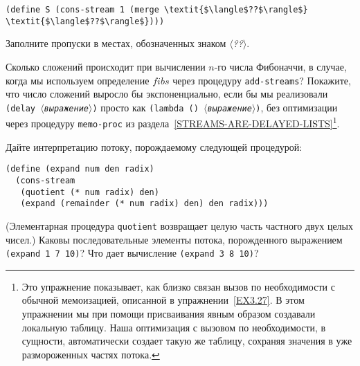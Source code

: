 \begin{exercise}{3.56}
\begin{Verbatim}[fontsize=\small]
(define S (cons-stream 1 (merge \textit{$\langle$??$\rangle$} \textit{$\langle$??$\rangle$})))
\end{Verbatim}
Заполните пропуски в местах, обозначенных знаком \textit{$\langle$??$\rangle$}.
\end{exercise}
\begin{exercise}{3.57}\label{EX3.57}%
Сколько сложений происходит при вычислении
$n$-го числа Фибоначчи, в случае, когда мы используем
определение $fibs$ через процедуру
{\tt add-streams}?  Покажите, что число сложений выросло бы
экспоненциально, если бы мы реализовали
{\tt (delay \textit{$\langle$выраже\-ние$\rangle$})} просто как
{\tt (lambda () \textit{$\langle$выражение$\rangle$})}, без оптимизации через
процедуру {\tt memo-proc} из
раздела~\ref{STREAMS-ARE-DELAYED-LISTS}\footnote{Это упражнение показывает, как близко связан
  вызов
по  необходимости с обычной мемоизацией,
описанной в упражнении~\ref{EX3.27}.  В этом упражнении мы при
помощи присваивания явным образом создавали локальную таблицу.  Наша
оптимизация с вызовом по необходимости, в сущности, автоматически
создает такую же таблицу, сохраняя значения в уже размороженных частях
потока.
}.
\end{exercise}
\begin{exercise}{3.58}\label{EX3.58}%
Дайте интерпретацию потоку, порождаемому следующей
процедурой:

\begin{Verbatim}[fontsize=\small]
(define (expand num den radix)
  (cons-stream
   (quotient (* num radix) den)
   (expand (remainder (* num radix) den) den radix)))
\end{Verbatim}
(Элементарная процедура   {\tt quotient} возвращает целую часть
частного двух целых чисел.)  Каковы последовательные элементы потока,
порожденного выражением {\tt (expand 1 7 10)}?  Что дает
вычисление {\tt (expand 3 8 10)}?
\end{exercise}
